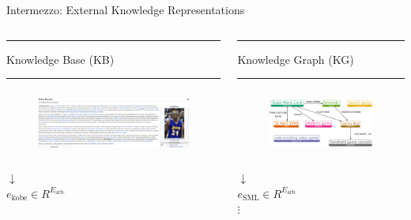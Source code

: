 \begin{frame}{Intermezzo: External Knowledge Representations }
    \begin{columns}
    \begin{column}[T]{0.5\textwidth}
    {\color{DTU_blue}\rule{\linewidth}{4pt}
    Knowledge Base (KB)  \hfill\rule{\linewidth}{4pt}}
    \begin{figure}
        \centering
        \includegraphics[height=2.2cm]{graphics/auxillary/KB_example.PNG}
    \end{figure}
    \vfill
    \begin{center}
        $\downarrow$ \\
        $e_{\mathrm{kobe}} \in R^{E_{\mathrm{arb.}}}$
    \end{center}
    \end{column}
    \begin{column}[T]{0.5\textwidth}
    {\color{DTU_orange}\rule{\linewidth}{4pt}
    Knowledge Graph (KG) \hfill\rule{\linewidth}{4pt}}
    \begin{figure}
        \centering
        \includegraphics[height=2.2cm]{graphics/auxillary/KG_example.PNG}
    \end{figure}
    \vfill
    \begin{center}
        $\downarrow$ \\
        $e_{\mathrm{SML}} \in R^{E_{\mathrm{arb.}}}$ \\
        $\vdots$ 
    \end{center}
    \end{column}
    \end{columns}
\end{frame}

